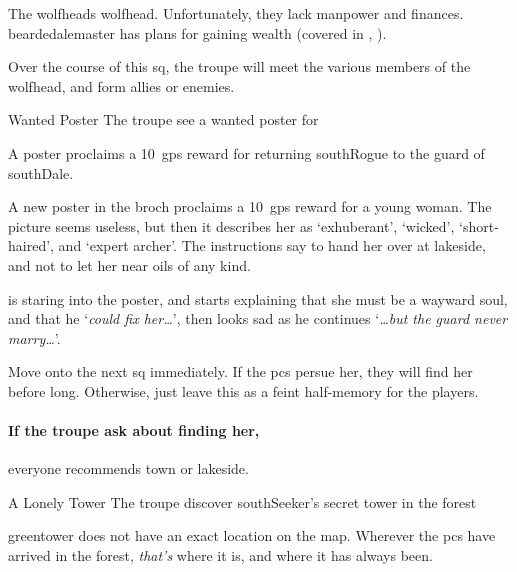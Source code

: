 \label{wolfHeads}

\noindent
The \glspl{wolfhead} \glsdesc{wolfhead}.
Unfortunately, they lack manpower and finances.
\Gls{beardedalemaster} has plans for gaining wealth (covered in , ).

Over the course of this \gls{sq}, the troupe will meet the various members of the \gls{wolfhead}, and form allies or enemies.

{\squash Wanted Poster}%
{The troupe see a wanted poster for }%

A poster proclaims a 10~\glspl{gp} reward for returning \gls{southRogue} to the \gls{guard} of \gls{southDale}.

\begin{boxtext}
  A new poster in the \gls{broch} proclaims a 10~\glspl{gp} reward for a young woman.
  The picture seems useless, but then it describes her as `exhuberant', `wicked', `short-haired', and `expert archer'.
  The instructions say to hand her over at \gls{lakeside}, and not to let her near oils of any kind.

   is staring into the poster, and starts explaining that she must be a wayward soul, and that he `\textit{could fix her\ldots}', then looks sad as he continues `\textit{\ldots but the \gls{guard} never marry\ldots}'.
\end{boxtext}

Move onto the next \gls{sq} immediately.
If the \glspl{pc} persue her, they will find her before long.
Otherwise, just leave this as a feint half-memory for the players.

\paragraph{If the troupe ask about finding her,}
everyone recommends \gls{town} or \gls{lakeside}.

{A Lonely Tower}%
{The troupe discover \gls{southSeeker}'s secret tower in the forest}%

\label{green_tower_sq}


\Gls{greentower} does not have an exact location on the map.
Wherever the \glspl{pc} have arrived in the forest, \textit{that's} where it is, and where it has always been.

